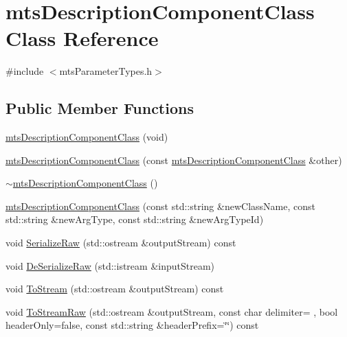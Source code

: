\hypertarget{classmts_description_component_class}{}\section{mts\+Description\+Component\+Class Class Reference}
\label{classmts_description_component_class}


{\ttfamily \#include $<$mts\+Parameter\+Types.\+h$>$}

\subsection*{Public Member Functions}
\begin{DoxyCompactItemize}
\item 
\hyperlink{classmts_description_component_class_a97c5fa52865686f59093d6fb52dfba5b}{mts\+Description\+Component\+Class} (void)
\item 
\hyperlink{classmts_description_component_class_ab0e25b88c7e43110bd2a2737d44a513a}{mts\+Description\+Component\+Class} (const \hyperlink{classmts_description_component_class}{mts\+Description\+Component\+Class} \&other)
\item 
\hyperlink{classmts_description_component_class_ab4dcaafd0d33e550fd554dd5ad5d3a09}{$\sim$mts\+Description\+Component\+Class} ()
\item 
\hyperlink{classmts_description_component_class_ada504bb95f48c446ea285cf779bfdce3}{mts\+Description\+Component\+Class} (const std\+::string \&new\+Class\+Name, const std\+::string \&new\+Arg\+Type, const std\+::string \&new\+Arg\+Type\+Id)
\item 
void \hyperlink{classmts_description_component_class_ad7f2d9731d39ab8b4dfaa8e0f7fe6f8b}{Serialize\+Raw} (std\+::ostream \&output\+Stream) const 
\item 
void \hyperlink{classmts_description_component_class_a5c5ab73ed5ccd0c81cd550e214017390}{De\+Serialize\+Raw} (std\+::istream \&input\+Stream)
\item 
void \hyperlink{classmts_description_component_class_afd63f6498c89edd871891b81ce23f9b0}{To\+Stream} (std\+::ostream \&output\+Stream) const 
\item 
void \hyperlink{classmts_description_component_class_aac33fa5a0cb0733f0ce259b6e4823fee}{To\+Stream\+Raw} (std\+::ostream \&output\+Stream, const char delimiter= \textquotesingle{} \textquotesingle{}, bool header\+Only=false, const std\+::string \&header\+Prefix=\char`\"{}\char`\"{}) const 

\end{DoxyCompactItemize}
